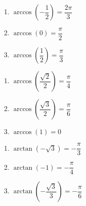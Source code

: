 \begin{multicols}{3} 

\begin{enumerate}

\setcounter{enumi}{\value{HW}}

\item $\arccos \left( -\dfrac{1}{2} \right) = \dfrac{2\pi}{3}$
\item $\arccos \left( 0 \right) = \dfrac{\pi}{2}$ 
\item $\arccos \left( \dfrac{1}{2} \right) = \dfrac{\pi}{3}$

\setcounter{HW}{\value{enumi}}

\end{enumerate}

\end{multicols}

\begin{multicols}{3} 

\begin{enumerate}

\setcounter{enumi}{\value{HW}}

\item $\arccos \left( \dfrac{\sqrt{2}}{2} \right) = \dfrac{\pi}{4}$
\item $\arccos \left( \dfrac{\sqrt{3}}{2} \right) = \dfrac{\pi}{6}$
\item $\arccos \left( 1 \right) = 0$ 

\setcounter{HW}{\value{enumi}}

\end{enumerate}

\end{multicols}

\begin{multicols}{3} 

\begin{enumerate}

\setcounter{enumi}{\value{HW}}

\item $\arctan \left( -\sqrt{3} \right) = -\dfrac{\pi}{3}$ 
\item $\arctan \left( -1 \right) = -\dfrac{\pi}{4}$ 
\item $\arctan \left( -\dfrac{\sqrt{3}}{3} \right) = -\dfrac{\pi}{6}$

\setcounter{HW}{\value{enumi}}

\end{enumerate}

\end{multicols}

